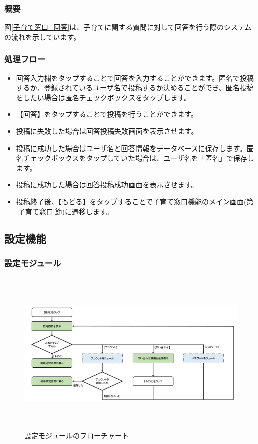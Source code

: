 \documentclass[a4j]{jarticle}
\begin{document}
\subsubsection*{概要}
図\ref{子育て窓口_回答}は、子育てに関する質問に対して回答を行う際のシステムの流れを示しています。
\subsubsection*{処理フロー}
\begin{itemize}
\item 回答入力欄をタップすることで回答を入力することができます。匿名で投稿するか、登録されているユーザ名で投稿するか決めることができ、匿名投稿をしたい場合は匿名チェックボックスをタップします。
\item 【回答】をタップすることで投稿を行うことができます。
\item 投稿に失敗した場合は回答投稿失敗画面を表示させます。
\item 投稿に成功した場合はユーザ名と回答情報をデータベースに保存します。匿名チェックボックスをタップしていた場合は、ユーザ名を「匿名」で保存します。
\item 投稿に成功した場合は回答投稿成功画面を表示させます。
\item 投稿終了後、【もどる】をタップすることで子育て窓口機能のメイン画面(第\ref{子育て窓口}節)に遷移します。

\end{itemize}

\newpage

\subsection{設定機能}
\subsubsection{設定モジュール\label{設定}} %
\begin{figure}[H]
    \begin{center}
      \includegraphics[height=8.0cm] {設定_全体.png} %
    \caption {設定モジュールのフローチャート}
    \label{設定_全体}
    \end{center}
\end{figure}
\end{document}

